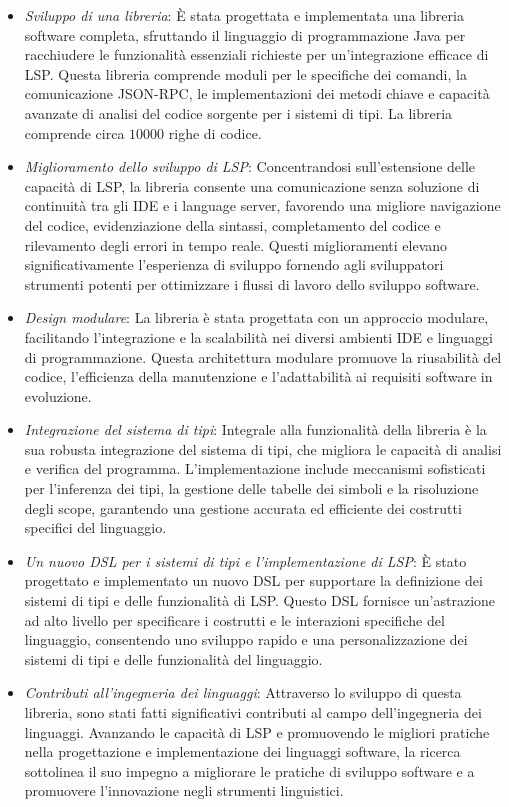 \documentclass{adapt-lab}
\begin{document}
\begin{itemize}
    \item \textit{Sviluppo di una libreria}: \`E stata progettata e implementata una libreria software completa, sfruttando il linguaggio di programmazione Java per racchiudere le funzionalità essenziali richieste per un'integrazione efficace di LSP. Questa libreria comprende moduli per le specifiche dei comandi, la comunicazione JSON-RPC, le implementazioni dei metodi chiave e capacità avanzate di analisi del codice sorgente per i sistemi di tipi. La libreria comprende circa $10000$ righe di codice.
    \item \textit{Miglioramento dello sviluppo di LSP}: Concentrandosi sull'estensione delle capacità di LSP, la libreria consente una comunicazione senza soluzione di continuità tra gli IDE e i language server, favorendo una migliore navigazione del codice, evidenziazione della sintassi, completamento del codice e rilevamento degli errori in tempo reale. Questi miglioramenti elevano significativamente l'esperienza di sviluppo fornendo agli sviluppatori strumenti potenti per ottimizzare i flussi di lavoro dello sviluppo software.
    \item \textit{Design modulare}: La libreria è stata progettata con un approccio modulare, facilitando l'integrazione e la scalabilità nei diversi ambienti IDE e linguaggi di programmazione. Questa architettura modulare promuove la riusabilità del codice, l'efficienza della manutenzione e l'adattabilità ai requisiti software in evoluzione.
    \item \textit{Integrazione del sistema di tipi}: Integrale alla funzionalità della libreria è la sua robusta integrazione del sistema di tipi, che migliora le capacità di analisi e verifica del programma. L'implementazione include meccanismi sofisticati per l'inferenza dei tipi, la gestione delle tabelle dei simboli e la risoluzione degli scope, garantendo una gestione accurata ed efficiente dei costrutti specifici del linguaggio.
    \item \textit{Un nuovo DSL per i sistemi di tipi e l'implementazione di LSP}: È stato progettato e implementato un nuovo DSL per supportare la definizione dei sistemi di tipi e delle funzionalità di LSP. Questo DSL fornisce un'astrazione ad alto livello per specificare i costrutti e le interazioni specifiche del linguaggio, consentendo uno sviluppo rapido e una personalizzazione dei sistemi di tipi e delle funzionalità del linguaggio.
    \item \textit{Contributi all'ingegneria dei linguaggi}: Attraverso lo sviluppo di questa libreria, sono stati fatti significativi contributi al campo dell'ingegneria dei linguaggi. Avanzando le capacità di LSP e promuovendo le migliori pratiche nella progettazione e implementazione dei linguaggi software, la ricerca sottolinea il suo impegno a migliorare le pratiche di sviluppo software e a promuovere l'innovazione negli strumenti linguistici.
\end{itemize}
\end{document}

